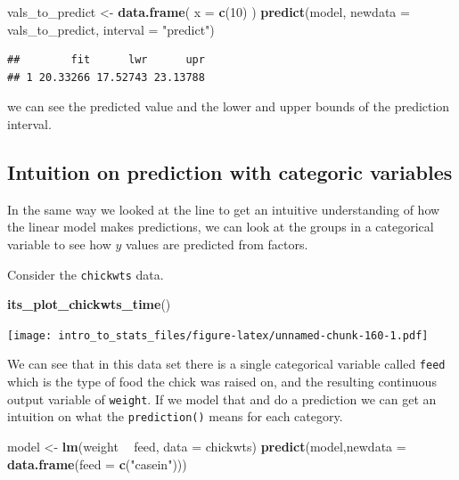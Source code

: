 \documentclass[
]{book}
\newenvironment{Shaded}{\begin{snugshade}}{\end{snugshade}}
\newcommand{\DataTypeTok}[1]{\textcolor[rgb]{0.13,0.29,0.53}{#1}}
\newcommand{\DecValTok}[1]{\textcolor[rgb]{0.00,0.00,0.81}{#1}}
\newcommand{\KeywordTok}[1]{\textcolor[rgb]{0.13,0.29,0.53}{\textbf{#1}}}
\newcommand{\NormalTok}[1]{#1}
\newcommand{\OperatorTok}[1]{\textcolor[rgb]{0.81,0.36,0.00}{\textbf{#1}}}
\newcommand{\StringTok}[1]{\textcolor[rgb]{0.31,0.60,0.02}{#1}}
\begin{document}
\begin{Shaded}
\begin{Highlighting}[]
\NormalTok{vals_to_predict <-}\StringTok{ }\KeywordTok{data.frame}\NormalTok{( }\DataTypeTok{x =} \KeywordTok{c}\NormalTok{(}\DecValTok{10}\NormalTok{) )}
\KeywordTok{predict}\NormalTok{(model, }\DataTypeTok{newdata =}\NormalTok{ vals_to_predict, }\DataTypeTok{interval =} \StringTok{"predict"}\NormalTok{)}
\end{Highlighting}
\end{Shaded}

\begin{verbatim}
##        fit      lwr      upr
## 1 20.33266 17.52743 23.13788
\end{verbatim}

we can see the predicted value and the lower and upper bounds of the prediction interval.

\hypertarget{intuition-on-prediction-with-categoric-variables}{%
\subsection{Intuition on prediction with categoric variables}\label{intuition-on-prediction-with-categoric-variables}}

In the same way we looked at the line to get an intuitive understanding of how the linear model makes predictions, we can look at the groups in a categorical variable to see how \(y\) values are predicted from factors.

Consider the \texttt{chickwts} data.

\begin{Shaded}
\begin{Highlighting}[]
\KeywordTok{its_plot_chickwts_time}\NormalTok{()}
\end{Highlighting}
\end{Shaded}

\texttt{[image: intro\_to\_stats\_files/figure-latex/unnamed-chunk-160-1.pdf]}

We can see that in this data set there is a single categorical variable called \texttt{feed} which is the type of food the chick was raised on, and the resulting continuous output variable of \texttt{weight}. If we model that and do a prediction we can get an intuition on what the \texttt{prediction()} means for each category.

\begin{Shaded}
\begin{Highlighting}[]
\NormalTok{model <-}\StringTok{ }\KeywordTok{lm}\NormalTok{(weight }\OperatorTok{~}\StringTok{ }\NormalTok{feed, }\DataTypeTok{data =}\NormalTok{ chickwts)}
\KeywordTok{predict}\NormalTok{(model,}\DataTypeTok{newdata =} \KeywordTok{data.frame}\NormalTok{(}\DataTypeTok{feed =} \KeywordTok{c}\NormalTok{(}\StringTok{"casein"}\NormalTok{)))}
\end{Highlighting}
\end{Shaded}
\end{document}
